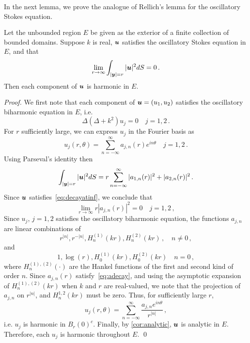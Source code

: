 In the next lemma, we prove the analogue of Rellich's lemma for the
oscillatory Stokes equation. 
\begin{lemma}
  \label{lem:rellich}
  Let the unbounded region $E$ be given as the exterior
  of a finite collection of bounded domains.
  Suppose $k$ is real, ${\boldsymbol u}$ satisfies the oscillatory
  Stokes equation in $E$, and that 
\begin{equation}
\lim_{r \to \infty} \int_{|{\boldsymbol y}|=r} |{\boldsymbol u}|^2 dS = 0 
\, . \label{eq:decayatinf}
\end{equation}
Then each component of ${\boldsymbol u}$ is harmonic in $E$.
\end{lemma}
\begin{proof}
We first note that each component of ${\boldsymbol u}= (u_{1},u_{2})$ satisfies the 
oscillatory biharmonic equation in $E$, i.e.
\begin{equation}
\Delta (\Delta + k^2) u_{j} = 0 \quad j=1,2 \,. \nonumber
\end{equation}
For $r$ sufficiently large, we can express $u_{j}$ in the Fourier basis as
\begin{equation}
u_{j}(r,\theta) = \sum_{n=-\infty}^{\infty} a_{j,n}(r) e^{i n \theta}  \quad 
j=1,2 \, . \nonumber
\end{equation}
Using Parseval's identity then
\begin{equation}
\int_{|{\boldsymbol y}|=r} |{\boldsymbol u}|^2 dS = r\sum_{n=-\infty}^{\infty} |a_{1,n}(r)|^2  +
|a_{2,n}(r)|^2 \, . \nonumber
\end{equation}
Since ${\boldsymbol u}$ satisfies~\cref{eq:decayatinf}, we conclude that
\begin{equation}
\lim_{r\to\infty} r|a_{j,n}(r)|^2 = 0 \quad j=1,2 \, , \label{eq:adecay}
\end{equation}
Since $u_{j}$, $j=1,2$ satisfies the oscillatory biharmonic equation,
the functions $a_{j,n}$ are linear combinations of 
\begin{equation}
r^{|n|}, r^{-|n|}, H^{(1)}_{n}(k r), H^{(2)}_{n}(k r) \, , \quad
n\neq 0 \, , \nonumber
\end{equation}
and
\begin{equation}
1, \log{(r)}, H^{(1)}_{0}(k r), H^{(2)}_{0}(k r) \quad n=0 \, ,  \nonumber
\end{equation} 
where $H_{n}^{(1),(2)}(\cdot)$ are the Hankel functions of the first and
second kind of order $n$.
Since $a_{j,n}(r)$ satisfy~\cref{eq:adecay}, and using the asymptotic 
expansion of $H_{n}^{(1),(2)}(kr)$ when $k$ and $r$ are real-valued, we note
that the projection of $a_{j,n}$ on $r^{|n|}$, and $H_{n}^{1,2}(k r)$
must be zero. Thus, for sufficiently large $r$,
\begin{equation}
u_{j}(r,\theta) = \sum_{n=-\infty}^{\infty} \frac{a_{j,n} e^{i n \theta}}{r^{|n|}} 
\, , \nonumber
\end{equation}
i.e. $u_{j}$ is harmonic 
in $B_{r}(0)^{c}$.
Finally, by \cref{cor:analytic}, ${\boldsymbol u}$ is
analytic in $E$. Therefore, each $u_j$ is harmonic
throughout $E$.
\qed
\end{proof}

